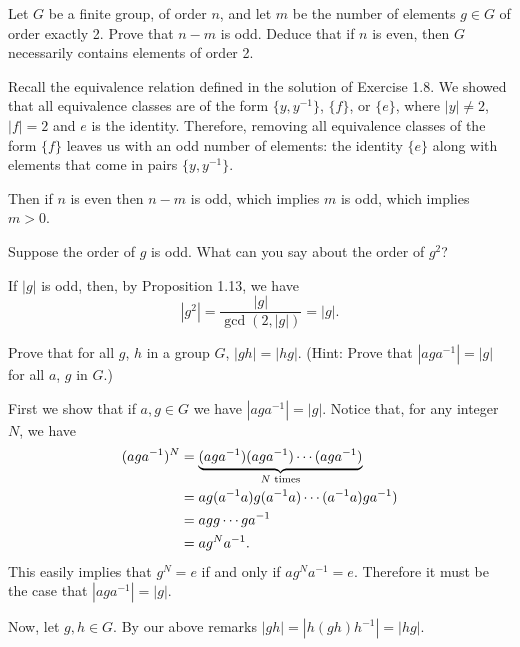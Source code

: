 \begin{exercise}
	Let $G$ be a finite group, of order $n$, and let $m$ be the number of elements $g\in G$ of order exactly 2. Prove that $n-m$ is odd. Deduce that if $n$ is even, then $G$ necessarily contains elements of order 2.
\end{exercise}
\begin{solution}
	Recall the equivalence relation defined in the solution of Exercise 1.8. We showed that all equivalence classes are of the form $\{y,y^{-1}\}$, $\{f\}$, or $\{e\}$, where $|y|\neq 2$, $|f| = 2$ and $e$ is the identity. Therefore, removing all equivalence classes of the form $\{f\}$ leaves us with an odd number of elements: the identity $\{e\}$ along with elements that come in pairs $\{y,y^{-1}\}$.
	
	Then if $n$ is even then $n-m$ is odd, which implies $m$ is odd, which implies $m>0$.
\end{solution}

\begin{exercise}
	Suppose the order of $g$ is odd. What can you say about the order of $g^2$?
\end{exercise}
\begin{solution}
	If $|g|$ is odd, then, by Proposition 1.13, we have
	\[
		|g^2| = \frac{|g|}{\gcd(2,|g|)} = |g|.
	\]
\end{solution}

\begin{exercise}
	Prove that for all $g$, $h$ in a group $G$, $|gh| = |hg|$. (Hint: Prove that $|aga^{-1}| = |g|$ for all $a$, $g$ in $G$.)
\end{exercise}
\begin{solution}
	First we show that if $a,g\in G$ we have $|aga^{-1}| = |g|$. Notice that, for any integer $N$, we have
	\begin{align*}
		(aga^{-1})^N &= \underbrace{(aga^{-1})(aga^{-1})\cdots (aga^{-1})}_{N \textnormal{ times}}\\
		&= ag(a^{-1}a)g(a^{-1}a)\cdots (a^{-1}a)ga^{-1})\\
		&= agg\cdots ga^{-1}\\
		&= ag^Na^{-1}.
	\end{align*}
	This easily implies that $g^N = e$ if and only if $ag^Na^{-1} = e$. Therefore it must be the case that $|aga^{-1}| = |g|$.
	
	Now, let $g,h\in G$. By our above remarks $|gh| = |h(gh)h^{-1}| = |hg|$.
\end{solution}

